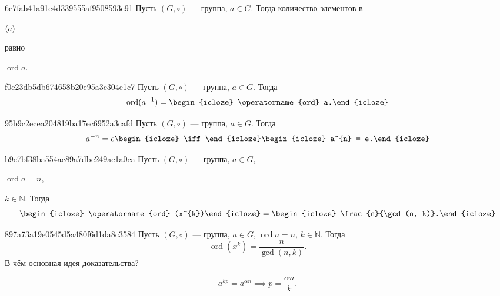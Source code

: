 \begin{note}{6c7fab41a91e4d339555af9508593e91}
    Пусть \({ (G, \circ) }\) --- группа,\: \({ a \in G }\).
    Тогда количество элементов в \begin{icloze}{2}\({ \langle a \rangle }\)\end{icloze} равно \begin{icloze}{1}\({ \operatorname{ord} a }\).\end{icloze}
\end{note}

\begin{note}{f0e23db5db674658b20e95a3c304e1c7}
    Пусть \({ (G, \circ) }\) --- группа,\: \({ a \in G }\).
    Тогда
    \[
        \operatorname{ord} (a^{-1}) = \begin{icloze}{1}\operatorname{ord} a.\end{icloze}
    \]
\end{note}

\begin{note}{95b9c2ecea204819ba17ec6952a3cafd}
    Пусть \({ (G, \circ) }\) --- группа,\: \({ a \in G }\).
    Тогда
    \[
        a^{-n} = e \begin{icloze}{2}\iff\end{icloze} \begin{icloze}{1}a^{n} = e.\end{icloze}
    \]
\end{note}

\begin{note}{b9e7bf38ba554ac89a7dbe249ac1a0ca}
    Пусть \({ (G, \circ) }\) --- группа,\: \({ a \in G }\),\: \begin{icloze}{3}\({ \operatorname{ord} a = n }\),\end{icloze}\: \({ k \in \mathbb N }\).
    Тогда
    \[
        \begin{icloze}{2}\operatorname{ord} (x^{k})\end{icloze} = \begin{icloze}{1}\frac{n}{\gcd(n, k)}.\end{icloze}
    \]
\end{note}

\begin{note}{897a73a19e0545d5a480f6d1da8c3584}
    Пусть \({ (G, \circ) }\) --- группа,\: \({ a \in G }\),\: \({ \operatorname{ord} a = n }\),\: \({ k \in \mathbb N }\).
    Тогда
    \[
        \operatorname{ord} (x^{k}) = \frac{n}{\gcd(n, k)}.
    \]
    В чём основная идея доказательства?

    \begin{cloze}{1}
        \[
            a^{kp} = a^{\alpha n} \implies p = \frac{\alpha n}{k}.
        \]
    \end{cloze}
\end{note}

